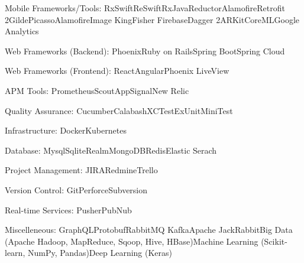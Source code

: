 \documentclass[10pt,a4paper]{article} %
\begin{document}
\inlineheadsection %
{Mobile Frameworks/Tools:}
{RxSwift\bull ReSwift\bull RxJava\bull Reductor\bull Alamofire\bull Retrofit 2\bull Gilde\bull Picasso\bull AlamofireImage \bull KingFisher
\bull Firebase\bull Dagger 2\bull ARKit\bull CoreML\bull Google Analytics}

\inlineheadsection %
{Web Frameworks (Backend):}
{Phoenix\bull Ruby on Rails\bull Spring Boot\bull Spring Cloud}

\inlineheadsection %
{Web Frameworks (Frontend):}
{React\bull Angular\bull Phoenix LiveView}

\inlineheadsection %
{APM Tools:}
{Prometheus\bull Scout\bull AppSignal\bull New Relic}

\inlineheadsection %
{Quality Assurance:}
{Cucumber\bull Calabash\bull XCTest\bull ExUnit\bull MiniTest}

\inlineheadsection %
{Infrastructure:}
{Docker\bull Kubernetes}

\inlineheadsection %
{Database:}
{Mysql\bull Sqlite\bull Realm\bull MongoDB\bull Redis\bull Elastic Serach}

\inlineheadsection %
{Project Management:}
{JIRA\bull Redmine\bull Trello}

\inlineheadsection %
{Version Control:}
{Git\bull Perforce\bull Subversion}

\inlineheadsection %
{Real-time Services:}
{Pusher\bull PubNub}

\inlineheadsection %
{Miscelleneous:}
{GraphQL\bull Protobuf\bull RabbitMQ \bull Kafka\bull Apache JackRabbit\bull Big Data (Apache Hadoop, MapReduce, Sqoop, Hive, HBase)\bull Machine Learning (Scikit-learn, NumPy, Pandas)\bull Deep Learning (Keras)}

\end{document}
